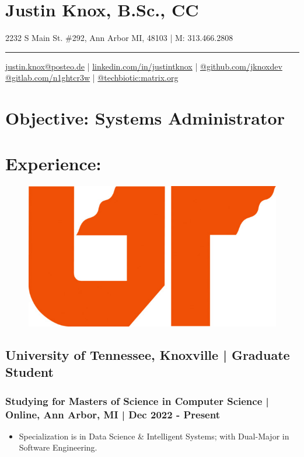 \documentclass[letter,10pt]{article}
\author{arx}
\date{\today}
\title{}
\begin{document}
\section*{Justin Knox, B.Sc., CC}
\label{sec:orgdc761dd}
2232 S Main St. \#292, Ann Arbor MI, 48103 | M: 313.466.2808

\noindent\rule{\textwidth}{0.5pt}
\href{mailto:justin.knox@posteo.de}{justin.knox@posteo.de} | \href{https://www.linkedin.com/in/justintknox}{linkedin.com/in/justintknox} | \href{https://www.github.com/jknoxdev}{@github.com/jknoxdev} \\
\href{https://gitlab.com/n1ghtcr3w}{@gitlab.com/n1ghtcr3w} | \href{https://matrix.to/\#/@techbiotic:matrix.org}{@techbiotic:matrix.org}


\section*{Objective:              Systems Administrator}
\label{sec:org28b0896}
\section*{Experience:}
\label{sec:org6aa0594}
\begin{figure}
\includegraphics[width=0.45\linewidth]{./img/50p_cr_utk.jpg}
\end{figure}

\subsection*{University of Tennessee, Knoxville | Graduate Student}
\label{sec:org8b7ad1e}
\subsubsection*{Studying for Masters of Science in Computer Science | Online, Ann Arbor, MI | Dec 2022 - Present}
\label{sec:org1a3e9cc}
\begin{itemize}
\item Specialization is in Data Science \& Intelligent Systems; with Dual-Major in Software Engineering.
\end{itemize}
\end{document}
